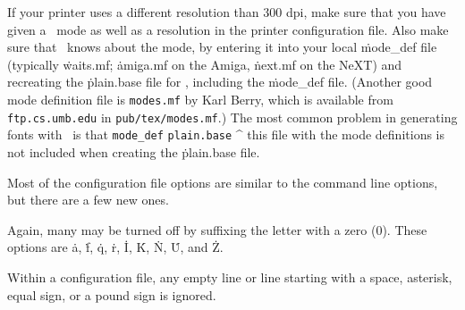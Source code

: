If your printer uses a different resolution than 300 dpi,
make sure that you
have given a \MF\ mode as well as a resolution in the printer
configuration file.  Also make sure that \MF\ knows about the mode,
by entering it into your local \.{mode\_def} file (typically
\.{waits.mf}; \.{amiga.mf} on the Amiga, \.{next.mf} on the NeXT)
and recreating the \.{plain.base} file for \MF, including the
\.{mode\_def} file.  (Another good mode definition file is
{\tt modes.mf} by Karl Berry, which is available from
{\tt ftp.cs.umb.edu} in {\tt pub/tex/modes.mf}.)
The most common problem in generating fonts
with \MF\ is that
\^{{\tt mode\_def}}
\^{{\tt plain.base}}
\^{\MF}
this file with the mode definitions is not included when creating
the \.{plain.base} file.


Most of the configuration file options are similar to the command line
options, but there are a few new ones.

Again, many may be turned off by suffixing the letter with a zero (0).
These options are \.a, \.f, \.q, \.r, \.I, \.K, \.N, \.U, and \.Z.

Within a configuration file, any empty line or line starting with a space,
asterisk, equal sign, or a pound sign is ignored.

